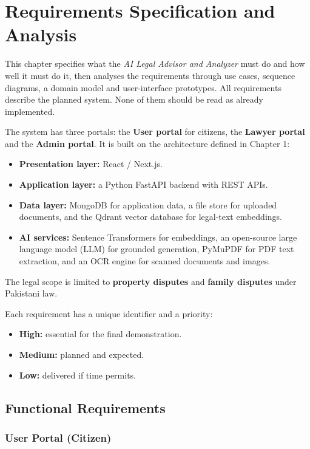 \chapter{Requirements Specification and Analysis}\label{ch:3}

This chapter specifies what the \emph{AI Legal Advisor and Analyzer} must do and how well it must do it, then analyses the requirements through use cases, sequence diagrams, a domain model and user-interface prototypes. All requirements describe the planned system. None of them should be read as already implemented.

The system has three portals: the \textbf{User portal} for citizens, the \textbf{Lawyer portal} and the \textbf{Admin portal}. It is built on the architecture defined in Chapter 1:

\begin{itemize}
  \item \textbf{Presentation layer:} React / Next.js.
  \item \textbf{Application layer:} a Python FastAPI backend with REST APIs.
  \item \textbf{Data layer:} MongoDB for application data, a file store for uploaded documents, and the Qdrant vector database for legal-text embeddings.
  \item \textbf{AI services:} Sentence Transformers for embeddings, an open-source large language model (LLM) for grounded generation, PyMuPDF for PDF text extraction, and an OCR engine for scanned documents and images.
\end{itemize}

The legal scope is limited to \textbf{property disputes} and \textbf{family disputes} under Pakistani law.

Each requirement has a unique identifier and a priority:

\begin{itemize}
  \item \textbf{High:} essential for the final demonstration.
  \item \textbf{Medium:} planned and expected.
  \item \textbf{Low:} delivered if time permits.
\end{itemize}

\section{Functional Requirements}

\subsection{User Portal (Citizen)}

